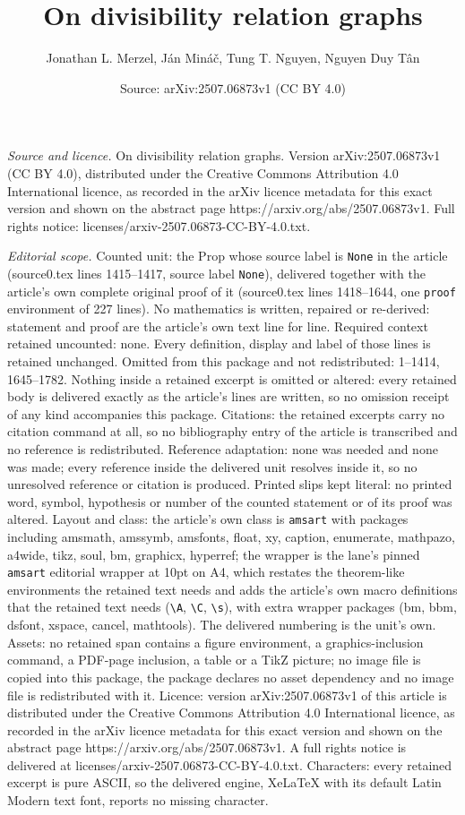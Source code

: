 \documentclass[10pt,a4paper]{amsart}
\title[On divisibility relation graphs]{On divisibility relation graphs}
\author{Jonathan L. Merzel, J\'an Min\'a\v{c}, Tung T. Nguyen, Nguyen Duy T\^an}
\date{Source: arXiv:2507.06873v1 (CC BY 4.0)}
\begin{document}
\maketitle

\noindent\emph{Source and licence.} On divisibility relation graphs. Version arXiv:2507.06873v1 (CC BY 4.0), distributed under the Creative Commons Attribution 4.0 International licence, as recorded in the arXiv licence metadata for this exact version and shown on the abstract page https://arxiv.org/abs/2507.06873v1. Full rights notice: licenses/arxiv-2507.06873-CC-BY-4.0.txt.\par\smallskip

\noindent\textit{Editorial scope.} Counted unit: the Prop whose source label is \texttt{None} in the article (source0.tex lines 1415--1417, source label \texttt{None}), delivered together with the article's own complete original proof of it (source0.tex lines 1418--1644, one \texttt{proof} environment of 227 lines). No mathematics is written, repaired or re-derived: statement and proof are the article's own text line for line. Required context retained uncounted: none. Every definition, display and label of those lines is retained unchanged. Omitted from this package and not redistributed: 1--1414, 1645--1782. Nothing inside a retained excerpt is omitted or altered: every retained body is delivered exactly as the article's lines are written, so no omission receipt of any kind accompanies this package. Citations: the retained excerpts carry no citation command at all, so no bibliography entry of the article is transcribed and no reference is redistributed. Reference adaptation: none was needed and none was made; every reference inside the delivered unit resolves inside it, so no unresolved reference or citation is produced. Printed slips kept literal: no printed word, symbol, hypothesis or number of the counted statement or of its proof was altered. Layout and class: the article's own class is \texttt{amsart} with packages including amsmath, amssymb, amsfonts, float, xy, caption, enumerate, mathpazo, a4wide, tikz, soul, bm, graphicx, hyperref; the wrapper is the lane's pinned \texttt{amsart} editorial wrapper at 10pt on A4, which restates the theorem-like environments the retained text needs and adds the article's own macro definitions that the retained text needs (\texttt{\textbackslash A}, \texttt{\textbackslash C}, \texttt{\textbackslash s}), with extra wrapper packages (bm, bbm, dsfont, xspace, cancel, mathtools). The delivered numbering is the unit's own. Assets: no retained span contains a figure environment, a graphics-inclusion command, a PDF-page inclusion, a table or a TikZ picture; no image file is copied into this package, the package declares no asset dependency and no image file is redistributed with it. Licence: version arXiv:2507.06873v1 of this article is distributed under the Creative Commons Attribution 4.0 International licence, as recorded in the arXiv licence metadata for this exact version and shown on the abstract page https://arxiv.org/abs/2507.06873v1. A full rights notice is delivered at licenses/arxiv-2507.06873-CC-BY-4.0.txt. Characters: every retained excerpt is pure ASCII, so the delivered engine, XeLaTeX with its default Latin Modern text font, reports no missing character.
\end{document}
